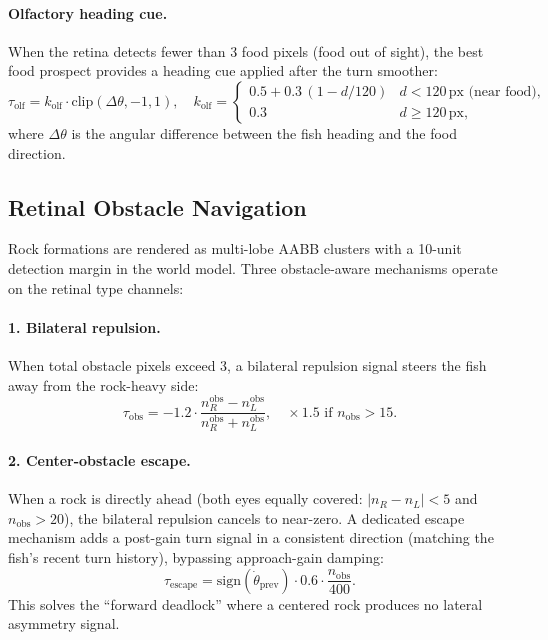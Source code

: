 \documentclass[11pt,a4paper]{article}
\begin{document}
\paragraph{Olfactory heading cue.}
When the retina detects fewer than 3 food pixels (food out of sight),
the best food prospect provides a heading cue applied after the
turn smoother:
\begin{equation}\label{eq:olfactory}
  \tau_\text{olf} = k_\text{olf} \cdot \text{clip}(\Delta\theta, -1, 1),
  \quad
  k_\text{olf} = \begin{cases}
    0.5 + 0.3\,(1 - d/120) & d < 120\,\text{px (near food)}, \\
    0.3 & d \geq 120\,\text{px},
  \end{cases}
\end{equation}
where $\Delta\theta$ is the angular difference between the fish heading
and the food direction.

\subsection{Retinal Obstacle Navigation}

Rock formations are rendered as multi-lobe AABB clusters with a 10-unit
detection margin in the world model.
Three obstacle-aware mechanisms operate on the retinal type channels:

\paragraph{1. Bilateral repulsion.}
When total obstacle pixels exceed 3, a bilateral repulsion signal
steers the fish away from the rock-heavy side:
\begin{equation}\label{eq:obs_repulsion}
  \tau_\text{obs} = -1.2 \cdot \frac{n_R^\text{obs} - n_L^\text{obs}}
                                     {n_R^\text{obs} + n_L^\text{obs}},
  \quad \times 1.5 \text{ if } n_\text{obs} > 15.
\end{equation}

\paragraph{2. Center-obstacle escape.}
When a rock is directly ahead (both eyes equally covered:
$|n_R - n_L| < 5$ and $n_\text{obs} > 20$), the bilateral repulsion
cancels to near-zero.  A dedicated escape mechanism adds a post-gain
turn signal in a consistent direction (matching the fish's recent turn
history), bypassing approach-gain damping:
\begin{equation}\label{eq:center_escape}
  \tau_\text{escape} = \text{sign}(\dot{\theta}_\text{prev}) \cdot 0.6
    \cdot \frac{n_\text{obs}}{400}.
\end{equation}
This solves the ``forward deadlock'' where a centered rock produces no
lateral asymmetry signal.
\end{document}
